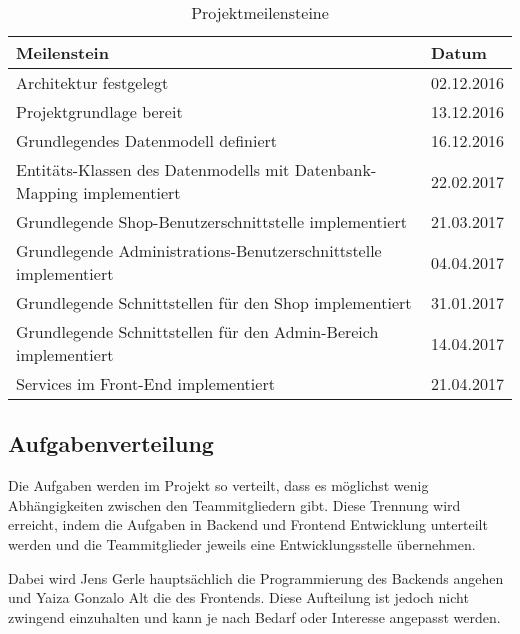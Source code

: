\begin{table}[ht!]
\begin{tabular}{|p{}|p{}|}
	\hline 
	\textbf{Meilenstein} & \textbf{Datum} \\ 
	\hline 
	Architektur festgelegt & 02.12.2016 \\ 
	\hline 
	Projektgrundlage bereit & 13.12.2016 \\ 
	\hline 
	Grundlegendes Datenmodell definiert & 16.12.2016 \\ 
	\hline 
	Entitäts-Klassen des Datenmodells mit Datenbank-Mapping implementiert & 22.02.2017 \\ 
	\hline 
	Grundlegende Shop-Benutzerschnittstelle implementiert & 21.03.2017 \\ 
	\hline 
	Grundlegende Administrations-Benutzerschnittstelle implementiert & 04.04.2017 \\ 
	\hline 
	Grundlegende Schnittstellen für den Shop implementiert & 31.01.2017 \\ 
	\hline 
	Grundlegende Schnittstellen für den Admin-Bereich implementiert & 14.04.2017 \\ 
	\hline 
	Services im Front-End implementiert	& 21.04.2017 \\ 
	\hline 
\end{tabular} 
\caption{Projektmeilensteine} \label{tab:milestones}
\end{table}


\subsection{Aufgabenverteilung}
Die Aufgaben werden im Projekt so verteilt, dass es möglichst wenig Abhängigkeiten zwischen den Teammitgliedern gibt. Diese Trennung wird erreicht, indem die Aufgaben in Backend und Frontend Entwicklung unterteilt werden und die Teammitglieder jeweils eine Entwicklungsstelle übernehmen.

Dabei wird Jens Gerle hauptsächlich die Programmierung des Backends angehen und Yaiza Gonzalo Alt die des Frontends.
Diese Aufteilung ist jedoch nicht zwingend einzuhalten und kann je nach Bedarf oder Interesse angepasst werden.















